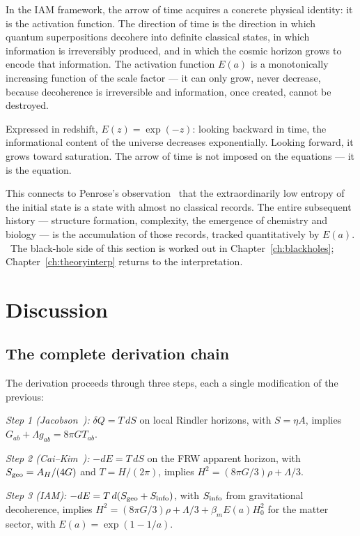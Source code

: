 In the IAM framework, the arrow of time acquires a concrete physical identity: it is the activation function. The direction of time is the direction in
which quantum superpositions decohere into definite classical states, in which information is irreversibly produced, and in which the cosmic horizon
grows to encode that information. The activation function $E(a)$ is a monotonically increasing function of the scale factor --- it can only grow, never
decrease, because decoherence is irreversible and information, once created, cannot be destroyed.

Expressed in redshift, $E(z)=\exp(-z)$: looking backward in time, the informational content of the universe decreases exponentially. Looking forward,
it grows toward saturation. The arrow of time is not imposed on the equations --- it is the equation. \interp

This connects to Penrose's observation~\cite{Penrose1989} that the extraordinarily low entropy of the initial state is a state with almost no classical
records. The entire subsequent history --- structure formation, complexity, the emergence of chemistry and biology --- is the accumulation of those
records, tracked quantitatively by $E(a)$. \interp\ The black-hole side of this section is worked out in Chapter~\ref{ch:blackholes}; Chapter~\ref{ch:theoryinterp} returns to the
interpretation.

\section{Discussion}\label{sec:th:discussion}
\subsection{The complete derivation chain}
The derivation proceeds through three steps, each a single modification of the previous:

\emph{Step 1 (Jacobson~\cite{Jacobson1995}):} $\delta Q=T\,dS$ on local Rindler horizons, with $S=\eta A$, implies $G_{ab}+\Lambda g_{ab}=8\pi GT_{ab}$. \derived

\emph{Step 2 (Cai--Kim~\cite{CaiKim2005}):} $-dE=T\,dS$ on the FRW apparent horizon, with $S_{\rm geo}=A_H/(4G)$ and $T=H/(2\pi)$, implies $H^2=(8\pi G/3)\rho+\Lambda/3$. \derived

\emph{Step 3 (IAM):} $-dE=T\,d(S_{\rm geo}+S_{\rm info})$, with $S_{\rm info}$ from gravitational decoherence, implies
$H^2=(8\pi G/3)\rho+\Lambda/3+\beta_mE(a)H_0^2$ for the matter sector, with $E(a)=\exp(1-1/a)$.

